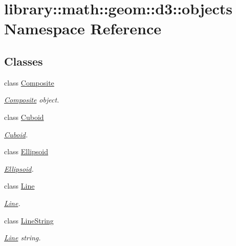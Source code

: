 \hypertarget{namespacelibrary_1_1math_1_1geom_1_1d3_1_1objects}{}\section{library\+:\+:math\+:\+:geom\+:\+:d3\+:\+:objects Namespace Reference}
\label{namespacelibrary_1_1math_1_1geom_1_1d3_1_1objects}
\subsection*{Classes}
\begin{DoxyCompactItemize}
\item 
class \hyperlink{classlibrary_1_1math_1_1geom_1_1d3_1_1objects_1_1_composite}{Composite}
\begin{DoxyCompactList}\small\item\em \hyperlink{classlibrary_1_1math_1_1geom_1_1d3_1_1objects_1_1_composite}{Composite} object. \end{DoxyCompactList}\item 
class \hyperlink{classlibrary_1_1math_1_1geom_1_1d3_1_1objects_1_1_cuboid}{Cuboid}
\begin{DoxyCompactList}\small\item\em \hyperlink{classlibrary_1_1math_1_1geom_1_1d3_1_1objects_1_1_cuboid}{Cuboid}. \end{DoxyCompactList}\item 
class \hyperlink{classlibrary_1_1math_1_1geom_1_1d3_1_1objects_1_1_ellipsoid}{Ellipsoid}
\begin{DoxyCompactList}\small\item\em \hyperlink{classlibrary_1_1math_1_1geom_1_1d3_1_1objects_1_1_ellipsoid}{Ellipsoid}. \end{DoxyCompactList}\item 
class \hyperlink{classlibrary_1_1math_1_1geom_1_1d3_1_1objects_1_1_line}{Line}
\begin{DoxyCompactList}\small\item\em \hyperlink{classlibrary_1_1math_1_1geom_1_1d3_1_1objects_1_1_line}{Line}. \end{DoxyCompactList}\item 
class \hyperlink{classlibrary_1_1math_1_1geom_1_1d3_1_1objects_1_1_line_string}{Line\+String}
\begin{DoxyCompactList}\small\item\em \hyperlink{classlibrary_1_1math_1_1geom_1_1d3_1_1objects_1_1_line}{Line} string. \end{DoxyCompactList}\item 

\end{DoxyCompactItemize}
